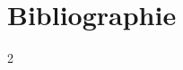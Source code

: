 \chapter*{Bibliographie}
\begin{multicols}{2}
\footnotesize{}\sloppy
\begingroup
\renewcommand{\chapter}[2]{}%


\endgroup
\end{multicols}

